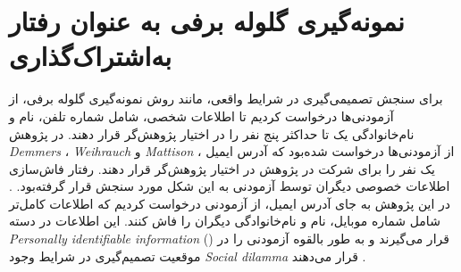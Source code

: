\section{نمونه‌گیری گلوله برفی به عنوان رفتار به‌اشتراک‌گذاری}
برای سنجش تصمیمی‌گیری در شرایط واقعی، مانند روش نمونه‌گیری گلوله برفی، از آزمودنی‌ها درخواست 
کردیم تا اطلاعات شخصی، شامل شماره تلفن، نام و نام‌خانوادگی یک تا حداکثر پنج نفر را در اختیار پژوهش‌گر قرار دهند.
در پژوهش 
\textit{
	\gls{Demmers}
}،
\textit{
	\gls{Weihrauch}
} و 
\textit{
	\gls{Mattison}
}،
از آزمودنی‌ها درخواست شده‌بود که آدرس ایمیل یک نفر را برای شرکت در پژوهش 
در اختیار پژوهش‌گر قرار دهند. رفتار فاش‌سازی اطلاعات خصوصی دیگران توسط آزمودنی به این شکل مورد سنجش  قرار گرفته‌بود.
\citep{demmersYourDataNot2021}.
در این پژوهش به جای آدرس ایمیل، از آزمودنی درخواست کردیم که اطلاعات کامل‌تر شامل شماره موبایل، نام و نام‌خانوادگی دیگران 
را فاش کنند. این اطلاعات در دسته 
\textit{
	\gls{Personally identifiable information}
}()\citep{mccallisterGuideProtectingConfidentiality2010a}
قرار می‌گیرند و به طور بالقوه آزمودنی را در موقعیت  تصمیم‌گیری در شرایط وجود
\textit{
	\gls{Social dilamma}
}
قرار می‌دهند
\citep{sanfilippoGoverningPrivacyKnowledge2021}.